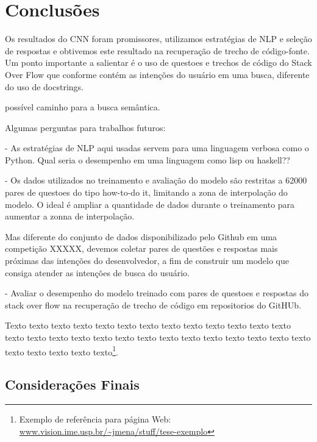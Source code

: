 \chapter{Conclusões}
\label{cap:conclusoes}


Os resultados do CNN foram promissores, utilizamos estratégias de NLP e seleção de respostas e obtivemos este resultado na recuperação de trecho de código-fonte. Um ponto importante a salientar é o uso de questoes e trechos de código do Stack Over Flow que conforme \cite{cambronero-deep-learning-code-search:2019} contém as intenções do usuário em uma busca, diferente do uso de docstrings.

possível caminho para a busca semântica.

Algumas perguntas para trabalhos futuros:

 - As estratégias de NLP aqui usadas servem para uma linguagem verbosa como o Python. Qual seria o desempenho em uma linguagem como lisp ou haskell??
 
 - Os dados utilizados no treinamento e avaliação do modelo são restritas a 62000 pares de questoes do tipo how-to-do it, limitando a zona de interpolação do modelo. O ideal é ampliar a quantidade de dados durante o treinamento para aumentar a zonna de interpolação. 
 
 
 Mas diferente do conjunto de dados disponibilizado pelo Github em uma competição XXXXX, devemos coletar pares de questões e respostas mais próximas das intenções do desenvolvedor, a fim de construir um modelo que consiga atender as intenções de busca do usuário.
 
 - Avaliar o desempenho do modelo treinado com pares de questoes e respostas do stack over flow na recuperação de trecho de código em repositorios do GitHUb. 


Texto texto texto texto texto texto texto texto texto texto texto texto texto
texto texto texto texto texto texto texto texto texto texto texto texto texto
texto texto texto texto texto texto\footnote{Exemplo de referência para página
Web: \url{www.vision.ime.usp.br/~jmena/stuff/tese-exemplo}}.

\section{Considerações Finais} 

